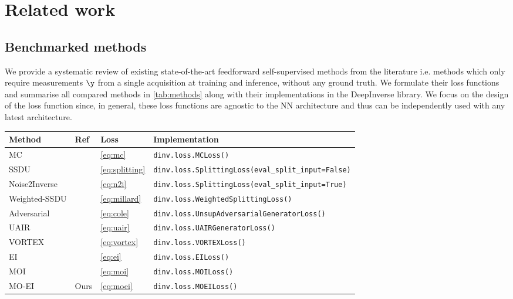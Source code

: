 \section{Related work}
\subsection{Benchmarked methods}
\label{sec:benchmark}
We provide a systematic review of existing state-of-the-art feedforward self-supervised methods from the literature i.e. methods which only require measurements $\y$ from a single acquisition at training and inference, without any ground truth. We formulate their loss functions and summarise all compared methods in \cref{tab:methods} along with their implementations in the DeepInverse \cite{tachella_deepinverse_2023} library. We focus on the design of the loss function since, in general, these loss functions are agnostic to the NN architecture and thus can be independently used with any latest architecture.

\begin{table*}[t]
\centering
\caption{Self-supervised losses reviewed in \cref{sec:benchmark}, implemented in DeepInverse and benchmarked in our experiments.}
\label{tab:methods}
\begin{tabular}{llll}
\hline
Method & Ref & Loss & Implementation \\ \hline
MC & \cite{darestani_accelerated_2021} & \cref{eq:mc} & \verb+dinv.loss.MCLoss()+ \\
SSDU & \cite{yaman_self-supervised_2020} & \cref{eq:splitting} & \verb+dinv.loss.SplittingLoss(eval_split_input=False)+ \\
Noise2Inverse & \cite{hendriksen_noise2inverse_2020} & \cref{eq:n2i} & \verb+dinv.loss.SplittingLoss(eval_split_input=True)+ \\
Weighted-SSDU & \cite{millard_theoretical_2023} & \cref{eq:millard} & \verb+dinv.loss.WeightedSplittingLoss()+ \\
Adversarial & \cite{cole_fast_2021} & \cref{eq:cole} & \verb+dinv.loss.UnsupAdversarialGeneratorLoss()+ \\
UAIR & \cite{pajot_unsupervised_2018} & \cref{eq:uair} & \verb+dinv.loss.UAIRGeneratorLoss()+ \\
VORTEX & \cite{desai_vortex_2022} & \cref{eq:vortex} & \verb+dinv.loss.VORTEXLoss()+ \\
EI & \cite{chen_equivariant_2021} & \cref{eq:ei} & \verb+dinv.loss.EILoss()+ \\
MOI & \cite{tachella_unsupervised_2022} & \cref{eq:moi} & \verb+dinv.loss.MOILoss()+ \\
MO-EI & Ours & \cref{eq:moei} & \verb+dinv.loss.MOEILoss()+ \\ \hline
\end{tabular}
\end{table*}

